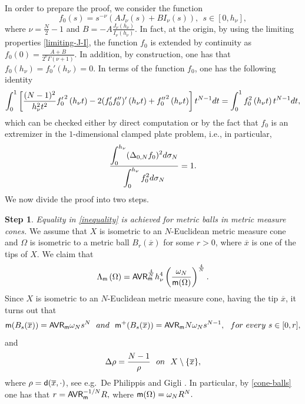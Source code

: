 \documentclass[11pt, reqno]{amsart}
\newcommand{\ds}{\displaystyle}
\numberwithin{equation}{section}
\begin{document}
\noindent In order to prepare the proof,  we consider the function  
		\begin{equation}\label{f-0-def}
			f_0(s)=s^{-\nu}(AJ_\nu(s)+BI_\nu(s)),\ \ s\in [0,h_\nu],
		\end{equation}
		where $\nu=\frac{N}{2}-1$ and $B=-A\frac{J_\nu(h_\nu)}{I_\nu(h_\nu)}.$ In fact, at the origin, by using the limiting properties \eqref{limiting-J-I}, the function $f_0$ is extended by continuity as $f_0(0)=\frac{A+B}{2^\nu\Gamma(\nu+1)}$. 
		In addition, by construction, one has that $f_0(h_\nu)=f_0'(h_\nu)=0.$ In terms of the function $f_0$, one has the  following identity
		\begin{equation}\label{identity-bessel}
			\ds\int_0^1 \left[\frac{(N-1)^2}{h_\nu^2t^2}{f_0'}^2\left(h_\nu t\right)-2(f_0'f_0'')'\left(h_\nu t\right)+{f_0''}^2\left(h_\nu t\right)\right]t^{N-1}{\rm d}t = \int_0^1f_0^2\left(h_\nu t\right)t^{N-1}{\rm d}t,
		\end{equation}
		which can be checked either by direct computation or by the  fact that $f_0$ is an extremizer in the $1$-dimensional clamped plate  problem, i.e., in particular, 
		\begin{equation}\label{laplace-f-0}
				\frac{\displaystyle \int_{0}^{h_\nu} (\Delta_{0,N} f_0)^2{\rm d}\sigma_N }{\displaystyle\int_{0}^{h_\nu} f_0^2 {\rm d}\sigma_N}=
			1.
		\end{equation}
	We now divide the proof into two steps. 
		
		\textbf{Step 1}. {\it Equality in \eqref{inequality} is achieved for metric balls in metric measure cones.} 
	We assume that $X$ is isometric to an $N$-Euclidean metric measure cone and $\Omega$ is isometric to a metric ball $B_r(\overline x)$ for some $r>0$, where $\overline x$ is one of the tips of $X$. We claim that
	\begin{equation}\label{cone-equality}
	   \Lambda_{\sf m}\left(\Omega\right)={\sf AVR}_ {\sf m}^\frac{4}{N}h_\nu^4\left(\frac{\omega_N}{{\sf m}(\Omega)}\right)^\frac{4}{N}. 
	\end{equation}
Since $X$ is isometric to an $N$-Euclidean metric measure cone, having the tip $\overline x$, it turns out that \begin{equation}\label{cone-balls}
    {\sf m}(B_s(\overline x))={\sf AVR}_ {\sf m}\omega_N s^{N}\ \ {\rm  and}\ \ {\sf m}^+(B_s(\overline x))={\sf AVR}_ {\sf m}N\omega_N s^{N-1},\ \ {\rm for\ every}\ s\in [0,r],
\end{equation}   and
	$$\Delta \rho =\frac{N-1}{\rho}\ \ {\rm on}\ \ X\setminus \{\overline x\},$$  where $\rho={\sf d}(\overline x,\cdot)$, see e.g.\ De Philippis and Gigli \cite[Proposition 3.7]{DeP-G}. In particular, by \eqref{cone-balls} one has that $r={\sf AVR}_ {\sf m}^{-{1}/{N}}R,$ where ${\sf m}(\Omega)=\omega_NR^N.$
\end{document}
